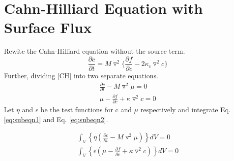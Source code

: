 \documentclass{article}
\begin{document}
\section{Cahn-Hilliard Equation with Surface Flux}
Rewite the Cahn-Hilliard equation without the source term.
\begin{equation}\label{CH}
\frac{\partial c}{\partial t} = M \triangledown^2 \Big \{ \frac{\partial f}{\partial c} - 2 \kappa_c \triangledown^2 c\Big\}
\end{equation}
Further, dividing \eqref{CH} into two separate equations.
\begin{subequations}\label{eq:subeqn}
   \begin{align}
   \frac{\partial c}{\partial t} - M\triangledown^2 \mu = 0  \label{eq:subeqn1} \\
   \mu - \frac{\partial f}{\partial c} + \kappa  \triangledown^2  c = 0 \label{eq:subeqn2}
   \end{align}
\end{subequations}
Let $\eta$ and $\epsilon$ be the test functions for c and $\mu$ respectively and integrate Eq. \eqref{eq:subeqn1} and Eq. \eqref{eq:subeqn2}.

\begin{subequations}\label{eq:subeqnn}
   \begin{align}
     \int_{V} \left\{ \eta \left( \frac{\partial c}{\partial t} - M\triangledown^2 \mu \right)  \right\} dV = 0 \label{eq:subeqnn1} \\
     \int_{V} \left\{\epsilon \left( \mu - \frac{\partial f}{\partial c} + \kappa  \triangledown^2  c \right) \right\}dV = 0
     \label{eq:subeqnn2}
   \end{align}
\end{subequations}
\end{document}
